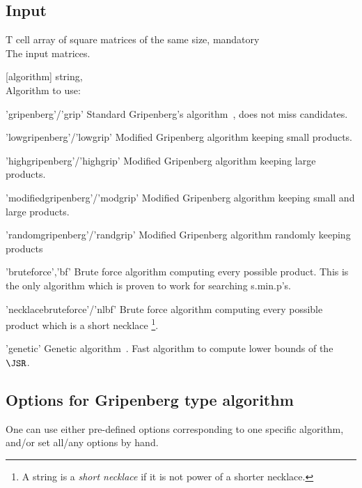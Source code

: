 \subsection*{Input}
\begin{param}
\item[T] cell array of square matrices of the same size, mandatory\\The input matrices.
\item[{[algorithm]}] string, \\ 
Algorithm to use:
\begin{param}
    \item['gripenberg'/'grip'] Standard Gripenberg's algorithm~\cite{Grip96}, does not miss candidates.
    
    \item['lowgripenberg'/'lowgrip']  Modified Gripenberg algorithm keeping small products.

    \item['highgripenberg'/'highgrip'] Modified Gripenberg algorithm keeping large products.
    
    \item['modifiedgripenberg'/'modgrip'] Modified Gripenberg algorithm  keeping small and large products.
    
    \item['randomgripenberg'/'randgrip'] Modified Gripenberg algorithm randomly keeping products
    
    \item['bruteforce','bf'] Brute force algorithm computing every possible product.
    This is the only algorithm which is proven to work for searching s.min.p's.
    
    \item['necklacebruteforce'/'nlbf'] Brute force algorithm computing every possible product which is a short necklace%
    \footnote{A string is a \emph{short necklace} if it is not power of a shorter necklace.}.
    
    \item['genetic'] Genetic algorithm~\cite{BC11}. Fast algorithm to compute lower bounds of the $\JSR$.
    \end{param}
\end{param}

\subsection{Options for Gripenberg type algorithm}
One can use either pre-defined options corresponding to one specific algorithm, and/or set all/any options by hand.

